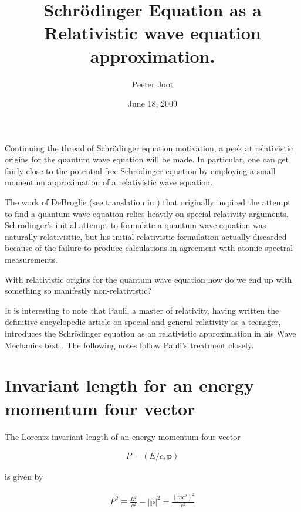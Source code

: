 \documentclass[]{eliblog}
\title{Schr\"{o}dinger Equation as a Relativistic wave equation approximation.}
\author{Peeter Joot}
\date{June 18, 2009}
\newcommand{\Abs}[1]{{\left\lvert{#1}\right\rvert}}
\newcommand{\Bp}[0]{\mathbf{p}}
\begin{document}
\maketitle

Continuing the thread of Schr\"{o}dinger equation motivation, a
peek at relativistic origins for the quantum wave equation will be
made.  In particular, one can get fairly close to the 
potential free Schr\"{o}dinger equation by employing
a small momentum approximation of a relativistic wave equation.

The work of DeBroglie (see translation in \cite{AFkracklauerDeBroglie}) 
that originally inspired the attempt to find a quantum wave equation
relies heavily on special relativity arguments.  
Schr\"{o}dinger's initial attempt to formulate a quantum wave equation
was naturally relativisitic, but his initial relativistic formulation 
actually discarded because of the failure to produce calculations in agreement
with atomic spectral measurements.

With relativistic origins for the quantum wave equation how do we end up
with something so manifestly non-relativistic?

It is interesting to note that Pauli, a master of relativity, having
written the definitive encyclopedic article 
\cite{pauli1981tr}
on special and general relativity
as a teenager, introduces the 
Schr\"{o}dinger equation as an relativistic approximation in his
Wave Mechanics text \cite{pauli2000wm}.  The following notes follow Pauli's treatment closely.

\section{Invariant length for an energy momentum four vector}

The Lorentz invariant length of an energy momentum four vector 

\begin{align}
P = (E/c, \Bp)
\end{align}

is given by

\begin{align}\label{eqn:Psquared}
P^2 \equiv \frac{E^2}{c^2} - \Abs{\Bp}^2 = \frac{(m c^2)^2}{c^2}
\end{align}
\end{document}
